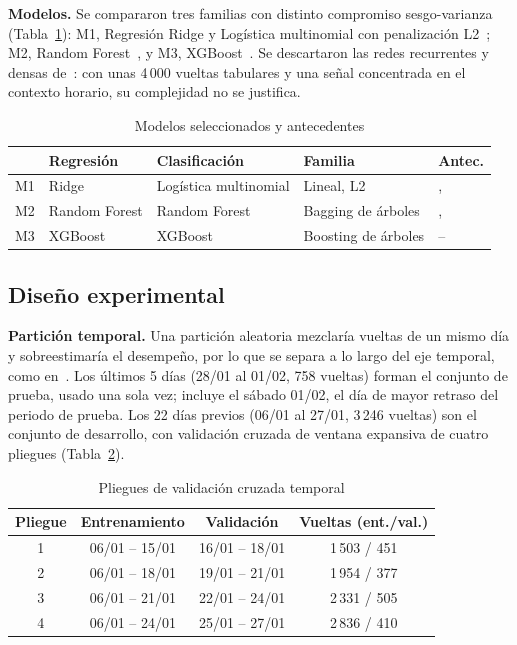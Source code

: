 \documentclass[conference]{IEEEtran}
\newcommand{\tablesize}{\fontsize{7}{8.4}\selectfont}
\begin{document}
\textbf{Modelos.} Se compararon tres familias con distinto compromiso sesgo-varianza~\cite{hastie2009} (Tabla~\ref{tab:modelos}): M1, Regresión Ridge y Logística multinomial con penalización L2~\cite{hoerl1970}; M2, Random Forest~\cite{breiman2001}, y M3, XGBoost~\cite{friedman2001,chen2016}. Se descartaron las redes recurrentes y densas de~\cite{rashvand2024,liu2020}: con unas 4\,000 vueltas tabulares y una señal concentrada en el contexto horario, su complejidad no se justifica.

\begin{table}[!t]
\centering
\caption{Modelos seleccionados y antecedentes}\label{tab:modelos}
\tablesize\setlength{\tabcolsep}{2.5pt}
\begin{tabular}{@{}lllll@{}}
\toprule
 & Regresión & Clasificación & Familia & Antec. \\
\midrule
M1 & Ridge & Logística multinomial & Lineal, L2 & \cite{taparia2020}, \cite{sun2021} \\
M2 & Random Forest & Random Forest & Bagging de árboles & \cite{martyanov2026}, \cite{cao2017} \\
M3 & XGBoost & XGBoost & Boosting de árboles & \cite{martyanov2026}--\cite{taparia2020} \\
\bottomrule
\end{tabular}
\end{table}

\subsection{Diseño experimental}\label{sec:diseno}
\textbf{Partición temporal.} Una partición aleatoria mezclaría vueltas de un mismo día y sobreestimaría el desempeño, por lo que se separa a lo largo del eje temporal, como en~\cite{martyanov2026}. Los últimos 5 días (28/01 al 01/02, 758 vueltas) forman el conjunto de prueba, usado una sola vez; incluye el sábado 01/02, el día de mayor retraso del periodo de prueba. Los 22 días previos (06/01 al 27/01, 3\,246 vueltas) son el conjunto de desarrollo, con validación cruzada de ventana expansiva de cuatro pliegues (Tabla~\ref{tab:folds}).

\begin{table}[!t]
\centering
\caption{Pliegues de validación cruzada temporal}\label{tab:folds}
\tablesize
\begin{tabular}{@{}cccc@{}}
\toprule
Pliegue & Entrenamiento & Validación & Vueltas (ent./val.) \\
\midrule
1 & 06/01 -- 15/01 & 16/01 -- 18/01 & 1\,503 / 451 \\
2 & 06/01 -- 18/01 & 19/01 -- 21/01 & 1\,954 / 377 \\
3 & 06/01 -- 21/01 & 22/01 -- 24/01 & 2\,331 / 505 \\
4 & 06/01 -- 24/01 & 25/01 -- 27/01 & 2\,836 / 410 \\
\bottomrule
\end{tabular}
\end{table}
\end{document}
